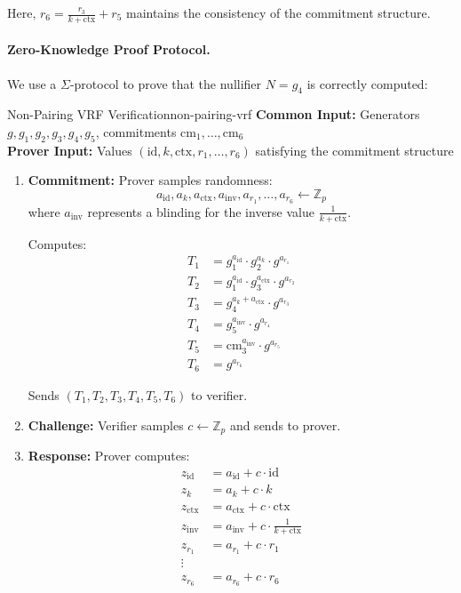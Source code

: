 Here, $r_6 = \frac{r_3}{k + \text{ctx}} + r_5$ maintains the consistency of the commitment structure.

\paragraph{Zero-Knowledge Proof Protocol.} We use a $\Sigma$-protocol to prove that the nullifier $N = g_4$ is correctly computed:

\begin{protocol}{Non-Pairing VRF Verification}{non-pairing-vrf}
\textbf{Common Input:} Generators $g, g_1, g_2, g_3, g_4, g_5$, commitments $\text{cm}_1, \ldots, \text{cm}_6$\\
\textbf{Prover Input:} Values $(\text{id}, k, \text{ctx}, r_1, \ldots, r_6)$ satisfying the commitment structure

\begin{enumerate}
    \item \textbf{Commitment:} Prover samples randomness:
    \[
        a_{\text{id}}, a_k, a_{\text{ctx}}, a_{\text{inv}}, a_{r_1}, \ldots, a_{r_6} \leftarrow \mathbb{Z}_p
    \]
    where $a_{\text{inv}}$ represents a blinding for the inverse value $\frac{1}{k + \text{ctx}}$.
    
    Computes:
    \begin{align}
        T_1 &= g_1^{a_{\text{id}}} \cdot g_2^{a_k} \cdot g^{a_{r_1}} \\
        T_2 &= g_1^{a_{\text{id}}} \cdot g_3^{a_{\text{ctx}}} \cdot g^{a_{r_2}} \\
        T_3 &= g_4^{a_k + a_{\text{ctx}}} \cdot g^{a_{r_3}} \\
        T_4 &= g_5^{a_{\text{inv}}} \cdot g^{a_{r_4}} \\
        T_5 &= \text{cm}_3^{a_{\text{inv}}} \cdot g^{a_{r_5}} \\
        T_6 &= g^{a_{r_6}}
    \end{align}
    
    Sends $(T_1, T_2, T_3, T_4, T_5, T_6)$ to verifier.
    
    \item \textbf{Challenge:} Verifier samples $c \leftarrow \mathbb{Z}_p$ and sends to prover.
    
    \item \textbf{Response:} Prover computes:
    \begin{align}
        z_{\text{id}} &= a_{\text{id}} + c \cdot \text{id} \\
        z_k &= a_k + c \cdot k \\
        z_{\text{ctx}} &= a_{\text{ctx}} + c \cdot \text{ctx} \\
        z_{\text{inv}} &= a_{\text{inv}} + c \cdot \frac{1}{k + \text{ctx}} \\
        z_{r_1} &= a_{r_1} + c \cdot r_1 \\
        \vdots \\
        z_{r_6} &= a_{r_6} + c \cdot r_6
    \end{align}
    

\end{enumerate}
\end{protocol}
